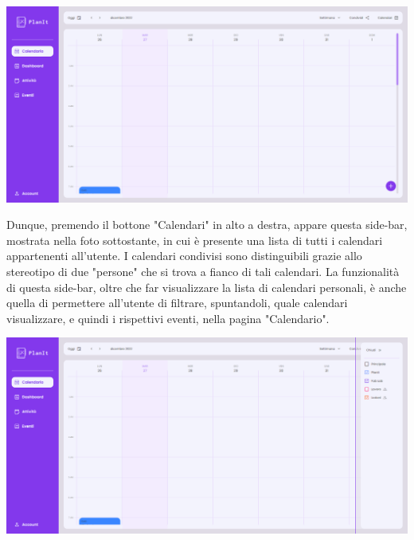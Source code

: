 \begin{center}
    \includegraphics[width=1\textwidth, height=0.3\textheight]{img/png/FrontEnd/Calendario/schermata_calendario.png}
\end{center}

Dunque, premendo il bottone "Calendari" in alto a destra, appare questa side-bar, mostrata nella foto sottostante, in cui è presente una lista di tutti i calendari appartenenti all'utente. I calendari condivisi sono distinguibili grazie allo stereotipo di due "persone" che si trova a fianco di tali calendari. La funzionalità di questa side-bar, oltre che far visualizzare la lista di calendari personali, è anche quella di permettere all'utente di filtrare, spuntandoli, quale calendari visualizzare, e quindi i rispettivi eventi, nella pagina "Calendario".

\begin{center}
    \includegraphics[width=1\textwidth, height=0.3\textheight]{img/png/FrontEnd/Calendario/calendario_calendari.png}
\end{center}

